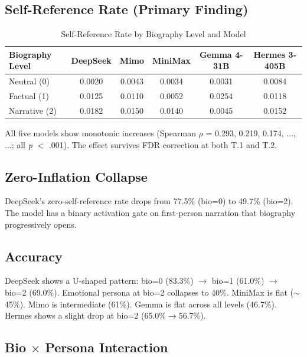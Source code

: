 \documentclass[11pt,a4paper]{article}
\begin{document}
\subsection{Self-Reference Rate (Primary Finding)}

\begin{table}[H]
\centering
\caption{Self-Reference Rate by Biography Level and Model}
\label{tab:sr_primary}
\begin{tabular}{lccccc}
\toprule
\textbf{Biography Level} & \textbf{DeepSeek} & \textbf{Mimo} & \textbf{MiniMax} & \textbf{Gemma 4-31B} & \textbf{Hermes 3-405B} \\
\midrule
Neutral (0) & 0.0020 & 0.0043 & 0.0034 & 0.0031 & 0.0084 \\
Factual (1) & 0.0125 & 0.0110 & 0.0052 & 0.0254 & 0.0118 \\
Narrative (2) & 0.0182 & 0.0150 & 0.0140 & 0.0045 & 0.0152 \\
\bottomrule
\end{tabular}
\end{table}

All five models show monotonic increases (Spearman $\rho$ = 0.293, 0.219, 0.174, ..., ...; all \textit{p} $<$ .001). The effect survives FDR correction at both T.1 and T.2.

\subsection{Zero-Inflation Collapse}

DeepSeek's zero-self-reference rate drops from 77.5\% (bio=0) to 49.7\% (bio=2). The model has a binary activation gate on first-person narration that biography progressively opens.

\subsection{Accuracy}

DeepSeek shows a U-shaped pattern: bio=0 (83.3\%) $\rightarrow$ bio=1 (61.0\%) $\rightarrow$ bio=2 (69.0\%). Emotional persona at bio=2 collapses to 40\%. MiniMax is flat ($\sim$45\%). Mimo is intermediate (61\%). Gemma is flat across all levels (46.7\%). Hermes shows a slight drop at bio=2 (65.0\%$\rightarrow$56.7\%).

\subsection{Bio $\times$ Persona Interaction}
\end{document}
